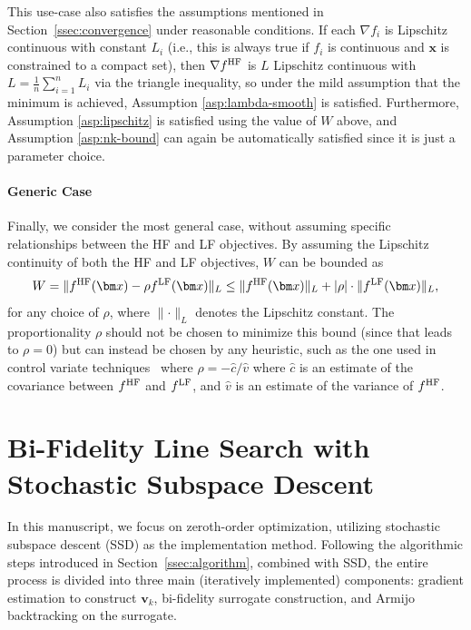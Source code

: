 \documentclass[10pt]{article} %
\numberwithin{equation}{section}
\theoremstyle{plain}
\theoremstyle{definition}
\newcommand{\<}{\langle}
\renewcommand{\>}{\rangle}
\renewcommand{\(}{\left(}
\renewcommand{\)}{\right)}
\renewcommand{\[}{\left[}
\renewcommand{\]}{\right]}
\newcommand{\HF}{\textup{HF}}
\newcommand{\LF}{\textup{LF}}
\begin{document}
This use-case also satisfies the assumptions mentioned in Section~\ref{ssec:convergence} under reasonable conditions.  If each $\nabla f_i$ is Lipschitz continuous with constant $L_i$ (i.e., this is always true if $f_i$ is continuous and $\bm x$ is constrained to a compact set), then $\nabla f^\HF$ is $L$ Lipschitz continuous with $L=\frac{1}{n}\sum_{i=1}^n L_i$ via the triangle inequality, so under the mild assumption that the minimum is achieved, Assumption \ref{asp:lambda-smooth} is satisfied.  Furthermore, Assumption \ref{asp:lipschitz} is satisfied using the value of $W$ above, and Assumption \ref{asp:nk-bound} can again be automatically satisfied since it is just a parameter choice.

\paragraph{Generic Case}
Finally, we consider the most general case, without assuming specific relationships between the HF and LF objectives. By assuming the Lipschitz continuity of both the HF and LF objectives, $W$ can be bounded as
\begin{equation}
    W = \lVert f^\HF(\bm x) - \rho f^\LF(\bm x) \rVert_L \leq \lVert f^\HF(\bm x) \rVert_L + \lvert \rho \rvert \cdot \lVert f^\LF(\bm x) \rVert_L,
\end{equation}
for any choice of $\rho$, where $\lVert \cdot \rVert_L$ denotes the Lipschitz constant. The proportionality $\rho$
should not be chosen to minimize this bound (since that leads to $\rho=0$) but can instead be chosen by any heuristic, such as the one used in control variate techniques~\citep{gorodetsky2020generalized} where $\rho=-\hat{c}/\hat{v}$ where $\hat{c}$ is an estimate of the covariance between $f^\HF$ and $f^\LF$, and $\hat{v}$ is an estimate of the variance of $f^\HF$. 

\section{Bi-Fidelity Line Search with Stochastic Subspace Descent}
\label{sec:implementation}

In this manuscript, we focus on zeroth-order optimization, utilizing stochastic subspace descent (SSD) as the implementation method. Following the algorithmic steps introduced in Section~\ref{ssec:algorithm}, combined with SSD, the entire process is divided into three main (iteratively implemented) components: gradient estimation to construct $\bm v_k$, bi-fidelity surrogate construction, and Armijo backtracking on the surrogate.
\end{document}
